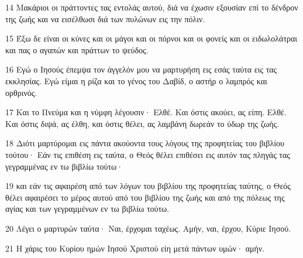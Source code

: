 \par 14 Μακάριοι οι πράττοντες τας εντολάς αυτού, διά να έχωσιν εξουσίαν επί το δένδρον της ζωής και να εισέλθωσι διά των πυλώνων εις την πόλιν.
\par 15 Έξω δε είναι οι κύνες και οι μάγοι και οι πόρνοι και οι φονείς και οι ειδωλολάτραι και πας ο αγαπών και πράττων το ψεύδος.
\par 16 Εγώ ο Ιησούς έπεμψα τον άγγελόν μου να μαρτυρήση εις εσάς ταύτα εις τας εκκλησίας. Εγώ είμαι η ρίζα και το γένος του Δαβίδ, ο αστήρ ο λαμπρός και ορθρινός.
\par 17 Και το Πνεύμα και η νύμφη λέγουσιν· Ελθέ. Και όστις ακούει, ας είπη. Ελθέ. Και όστις διψά, ας έλθη, και όστις θέλει, ας λαμβάνη δωρεάν το ύδωρ της ζωής.
\par 18 Διότι μαρτύρομαι εις πάντα ακούοντα τους λόγους της προφητείας του βιβλίου τούτου· Εάν τις επιθέση εις ταύτα, ο Θεός θέλει επιθέσει εις αυτόν τας πληγάς τας γεγραμμένας εν τω βιβλίω τούτω·
\par 19 και εάν τις αφαιρέση από των λόγων του βιβλίου της προφητείας ταύτης, ο Θεός θέλει αφαιρέσει το μέρος αυτού από του βιβλίου της ζωής και από της πόλεως της αγίας και των γεγραμμένων εν τω βιβλίω τούτω.
\par 20 Λέγει ο μαρτυρών ταύτα· Ναι, έρχομαι ταχέως. Αμήν, ναι, έρχου, Κύριε Ιησού.
\par 21 Η χάρις του Κυρίου ημών Ιησού Χριστού είη μετά πάντων υμών· αμήν.



